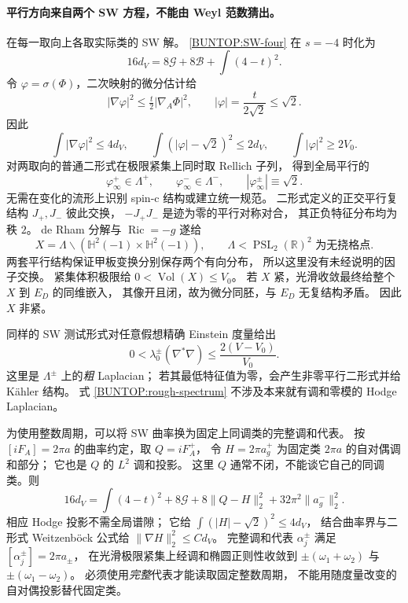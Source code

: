 \documentclass[UTF8,fontset=fandol,zihao=-4,oneside,openany]{ctexbook}
\theoremstyle{cjkplain}
\numberwithin{equation}{chapter}
\begin{document}
\paragraph{平行方向来自两个 SW 方程，不能由 Weyl 范数猜出。}
在每一取向上各取实际类的 SW 解。
\eqref{BUNTOP:SW-four} 在 \(s=-4\) 时化为
\begin{equation}
 16d_V=8\mathcal G+8\mathcal B+\int(4-t)^2 .
 \label{BUNTOP:exact-SW-defect}
\end{equation}
令 \(\varphi=\sigma(\Phi)\)，二次映射的微分估计给
\[
 |\nabla\varphi|^2\le\tfrac t2|\nabla_A\Phi|^2,\qquad
 |\varphi|=\frac{t}{2\sqrt2}\le\sqrt2.
\]
因此
\begin{equation}
 \int|\nabla\varphi|^2\le4d_V,\qquad
 \int(|\varphi|-\sqrt2)^2\le2d_V,\qquad
 \int|\varphi|^2\ge2V_0 .
 \label{BUNTOP:near-parallel}
\end{equation}
对两取向的普通二形式在极限紧集上同时取 Rellich 子列，
得到全局平行的
\[
 \varphi_\infty^+\in\Lambda^+,\qquad
 \varphi_\infty^-\in\Lambda^-,\qquad
 |\varphi_\infty^\pm|\equiv\sqrt2 .
\]
无需在变化的流形上识别 spin-c 结构或建立统一规范。
二形式定义的正交平行复结构 \(J_+,J_-\) 彼此交换，
\(-J_+J_-\) 是迹为零的平行对称对合，
其正负特征分布均为秩 \(2\)。
de Rham 分解与 \(\operatorname{Ric}=-g\) 遂给
\begin{equation}
 X=\Lambda\backslash(\mathbb H^2(-1)\times\mathbb H^2(-1)),
 \qquad
 \Lambda<\operatorname{PSL}_2(\mathbb R)^2
 \text{ 为无挠格点}.
 \label{BUNTOP:limit-lattice}
\end{equation}
两套平行结构保证甲板变换分别保存两个有向分布，
所以这里没有未经说明的因子交换。
紧集体积极限给 \(0<\operatorname{Vol}(X)\le V_0\)。
若 \(X\) 紧，光滑收敛最终给整个 \(X\) 到 \(E_D\) 的同维嵌入，
其像开且闭，故为微分同胚，与 \(E_D\) 无复结构矛盾。
因此 \(X\) 非紧。

同样的 SW 测试形式对任意假想精确 Einstein 度量给出
\begin{equation}
 0<\lambda_0^\pm(\nabla^*\nabla)
 \le\frac{2(V-V_0)}{V_0}.
 \label{BUNTOP:rough-spectrum}
\end{equation}
这里是 \(\Lambda^\pm\) 上的\emph{粗} Laplacian；
若其最低特征值为零，会产生非零平行二形式并给 K\"ahler 结构。
式 \eqref{BUNTOP:rough-spectrum} 不涉及本来就有调和零模的 Hodge Laplacian。

为使用整数周期，可以将 SW 曲率换为固定上同调类的完整调和代表。
按 \([iF_A]=2\pi a\) 的曲率约定，取 \(Q=iF_A^+\)，
令 \(H=2\pi a_g^+\) 为固定类 \(2\pi a\) 的自对偶调和部分；
它也是 \(Q\) 的 \(L^2\) 调和投影。
这里 \(Q\) 通常不闭，不能谈它自己的同调类。则
\[
 16d_V=\int(4-t)^2+8\mathcal G
       +8\|Q-H\|_2^2+32\pi^2\|a_g^-\|_2^2.
\]
相应 Hodge 投影不需全局谱隙；
它给 \(\int(|H|-\sqrt2)^2\le4d_V\)，
结合曲率界与二形式 Weitzenb\"ock 公式给
\(\|\nabla H\|_2^2\le C d_V\)。
完整调和代表 \(\alpha_j^\pm\) 满足
\([\alpha_j^\pm]=2\pi a_\pm\)，
在光滑极限紧集上经调和椭圆正则性收敛到
\(\pm(\omega_1+\omega_2)\) 与 \(\pm(\omega_1-\omega_2)\)。
必须使用\emph{完整}代表才能读取固定整数周期，
不能用随度量改变的自对偶投影替代固定类。
\end{document}
